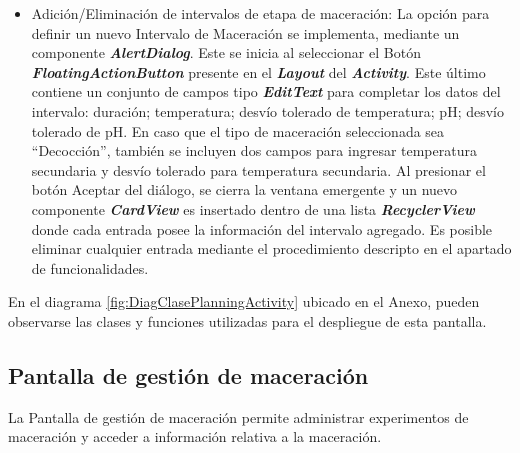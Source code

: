 \begin{itemize}
                    \item Adición/Eliminación de intervalos de etapa de maceración: La opción para definir un nuevo Intervalo de Maceración se implementa, mediante un componente \textbf{\textit{\gls{AlertDialog}}}. Este se inicia al seleccionar el Botón \textbf{\textit{\gls{FloatingActionButton}}} presente en el \textbf{\textit{\gls{Layout}}} del \textbf{\textit{\gls{Activity}}}. Este último contiene un conjunto de campos tipo \textbf{\textit{\gls{EditText}}} para completar los datos del intervalo: duración; temperatura; desvío tolerado de temperatura; pH; desvío tolerado de pH. En caso que el tipo de maceración seleccionada sea ``Decocción'', también se incluyen dos campos para ingresar temperatura secundaria y desvío tolerado para temperatura secundaria. Al presionar el botón Aceptar del diálogo, se cierra la ventana emergente y un nuevo componente \textbf{\textit{\gls{CardView}}} es insertado dentro de una lista \textbf{\textit{\gls{RecyclerView}}} donde cada entrada posee la información del intervalo agregado. Es posible eliminar cualquier entrada mediante el procedimiento descripto en el apartado de funcionalidades.
                \end{itemize}
                
                \par En el diagrama \ref{fig:DiagClasePlanningActivity} ubicado en el Anexo, pueden observarse las clases y funciones utilizadas para el despliegue de esta pantalla.
        
        \subsection{Pantalla de gestión de maceración}
        \label{DescripPantallaGestiónMaceración}
            \par La Pantalla de gestión de maceración permite administrar experimentos de maceración y acceder a información relativa a la maceración.
            
